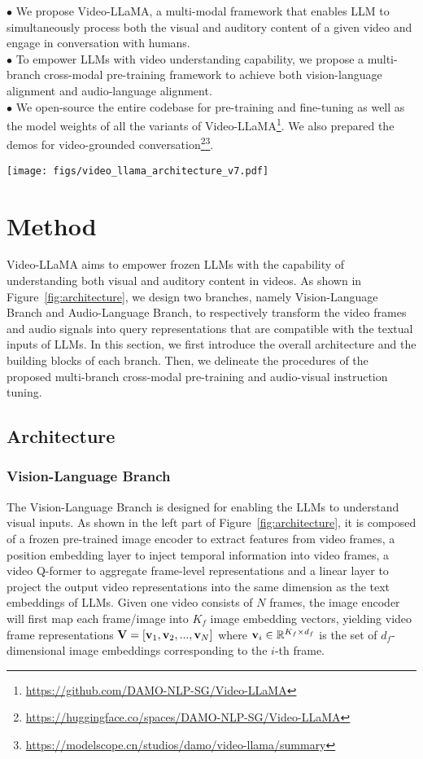 \indent $\bullet$ We propose Video-LLaMA, a multi-modal framework that enables LLM to simultaneously process both the visual and auditory content of a given video and engage in conversation with humans.
\\ 
\indent $\bullet$ To empower LLMs with video understanding capability, we propose a multi-branch cross-modal pre-training framework to achieve both vision-language alignment and audio-language alignment. \\
\indent $\bullet$ We open-source the entire codebase for pre-training and fine-tuning as well as the model weights of all the variants of Video-LLaMA\footnote{\url{https://github.com/DAMO-NLP-SG/Video-LLaMA}}. We also prepared the demos for video-grounded conversation\footnote{\url{https://huggingface.co/spaces/DAMO-NLP-SG/Video-LLaMA}}\footnote{\url{https://modelscope.cn/studios/damo/video-llama/summary}}.
\begin{figure*}[ht]
    \centering
    \texttt{[image: figs/video\_llama\_architecture\_v7.pdf]}
    \caption{Overall architecture of Video-LLaMA.}
    \label{fig:architecture}
\end{figure*}

\section{Method}
Video-LLaMA aims to empower frozen LLMs with the capability of understanding both visual and auditory content in videos. As shown in Figure~\ref{fig:architecture}, we design two branches, namely Vision-Language Branch and Audio-Language Branch, to respectively transform the video frames and audio signals into query representations that are compatible with the textual inputs of LLMs. In this section, we first introduce the overall architecture and the building blocks of each branch. Then, we delineate the procedures of the proposed multi-branch cross-modal pre-training and audio-visual instruction tuning.

\subsection{Architecture}
\subsubsection{Vision-Language Branch} 
The Vision-Language Branch is designed for enabling the LLMs to understand visual inputs. As shown in the left part of Figure~\ref{fig:architecture}, it is composed of a frozen pre-trained image encoder to extract features from video frames, a position embedding layer to inject temporal information into video frames, a video Q-former to aggregate frame-level representations and a linear layer to project the output video representations into the same dimension as the text embeddings of LLMs. Given one video consists of $N$ frames, the image encoder will first map each frame/image into $K_f$ image embedding vectors, yielding video frame representations $\mathrm{\bf V} = [\mathrm{\bf v}_1,\mathrm{\bf v}_2,...,\mathrm{\bf v}_N]$ where $\mathrm{\bf v}_i \in \mathbb{R}^{ K_f \times d_f}$ is the set of $d_f$-dimensional image embeddings  corresponding to the $i$-th frame.  

